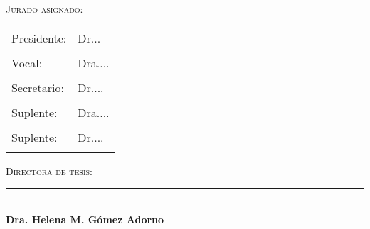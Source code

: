 \vspace{0.5cm}
\Large{{\scshape Jurado asignado:}}

\vspace{2.0cm}
\begin{tabular}{l l}
\Large{Presidente:} & \Large{Dr... } \\
\\ 
\Large{Vocal:} & \Large{Dra....}\\
\\
\Large{Secretario:} & \Large{Dr....}\\
\\
\Large{Suplente:} & \Large{Dra....}\\
\\
\Large{Suplente:} & \Large{Dr....}\\
\\ 
\end{tabular}

\vspace{2.5cm}

\begin{center}
\Large{ \scshape{Directora de tesis:}}
\vspace{0.8cm}


\rule[0mm]{6.5cm}{0.2mm} \\
\Large{\bf Dra. Helena M. Gómez Adorno} \\


\end{center}
\normalsize

